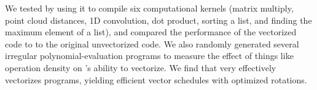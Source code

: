 We tested \system by using it to compile six computational kernels (matrix multiply, point cloud distances, 1D convolution, dot product, sorting a list, and finding the maximum element of a list), and compared the performance of the vectorized code to to the original unvectorized code.
We also randomly generated several irregular polynomial-evaluation programs to measure the effect of things like operation density on \system's ability to vectorize. 
We find that \system very effectively vectorizes programs, yielding efficient vector schedules with optimized rotations.

